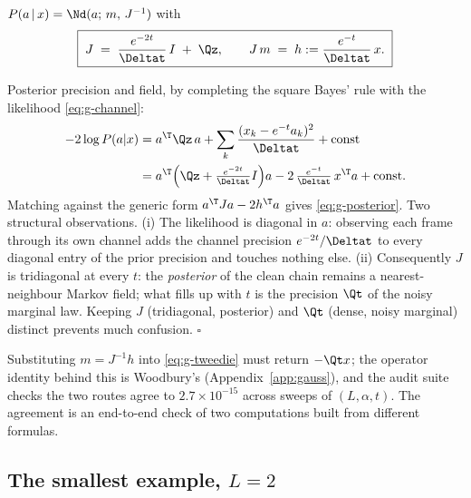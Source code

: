 \begin{proposition}\label{prop:g-posterior}
$P(a \,|\, x) = \Nd(a;\, m,\, J^{-1})$ with
\begin{equation}
  \boxed{\;
  J \;=\; \frac{e^{-2t}}{\Deltat}\, I \;+\; \Qz ,
  \qquad
  J\, m \;=\; h := \frac{e^{-t}}{\Deltat}\, x .
  \;}
  \label{eq:g-posterior}
\end{equation}
\end{proposition}

\begin{toolbox}{Posterior precision and field, by completing the square}
Bayes' rule with the likelihood \eqref{eq:g-channel}:
\begin{align*}
  -2 \log P(a | x)
  &= a^\T \Qz\, a
  + \sum_{k} \frac{(x_k - e^{-t} a_k)^2}{\Deltat}
  + \text{const} \\
  &= a^\T \Big( \Qz + \tfrac{e^{-2t}}{\Deltat} I \Big) a
  - 2\, \tfrac{e^{-t}}{\Deltat}\, x^\T a
  + \text{const}.
\end{align*}
Matching against the generic form $a^\T J a - 2 h^\T a$ gives
\eqref{eq:g-posterior}. Two structural observations. (i) The likelihood is
diagonal in $a$: observing each frame through its own channel adds the
channel precision $e^{-2t}/\Deltat$ to every diagonal entry of the prior
precision and touches nothing else. (ii) Consequently $J$ is tridiagonal
at every $t$: the \emph{posterior} of the clean chain remains a
nearest-neighbour Markov field; what fills up with $t$ is the precision
$\Qt$ of the noisy marginal law. Keeping $J$ (tridiagonal, posterior) and
$\Qt$ (dense, noisy marginal) distinct prevents much confusion.
\hfill$\square$
\end{toolbox}

Substituting $m = J^{-1} h$ into \eqref{eq:g-tweedie} must return
$-\Qt x$; the operator identity behind this is Woodbury's
(Appendix~\ref{app:gauss}), and the audit suite checks the two routes
agree to $2.7 \times 10^{-15}$ across sweeps of $(L, \alpha, t)$. The
agreement is an end-to-end check of two computations built from different
formulas.

\subsection{The smallest example, $L = 2$}\label{sec:g-K2}

